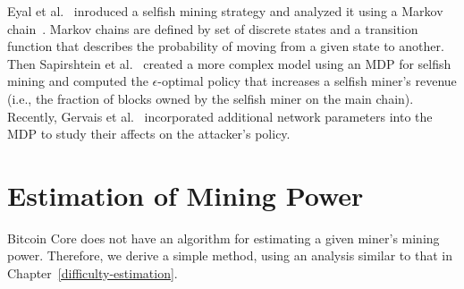 Eyal et al.~\cite{eyal:2014} inroduced a selfish mining strategy and analyzed it using a Markov chain~\cite{Markov:1971}. Markov chains are defined by set of discrete states and a transition function that describes the probability of moving from a given state to another. Then Sapirshtein et al.~\cite{sapirshtein:2015} created a more complex model using an MDP for selfish mining and computed the $\epsilon$-optimal policy that increases a selfish miner's revenue (i.e., the fraction of blocks owned by the selfish miner on the main chain). Recently, Gervais et al.~\cite{Gervais:2016} incorporated additional network parameters into the MDP to study their affects on the attacker's policy. %

\section{Estimation of Mining Power}
Bitcoin Core does not have an algorithm for estimating a given miner's mining power. Therefore, we derive a simple method, using an analysis similar to that in Chapter~\ref{difficulty-estimation}.

